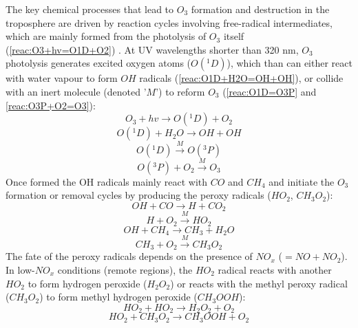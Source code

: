 \documentclass[11pt,a4paper]{article}
\begin{document}
The key chemical processes that lead to $O_3$ formation and destruction in the troposphere are driven by reaction cycles involving free-radical intermediates, which are mainly formed from the photolysis of $O_3$ itself (\ref{reac:O3+hv=O1D+O2}) \citep{Fowler2008}. At UV wavelengths shorter than 320 nm, $O_3$ photolysis generates excited oxygen atoms ($O(^1D)$), which than can either react with water vapour to form $OH$ radicals (\ref{reac:O1D+H2O=OH+OH}), or collide with an inert molecule (denoted '$M$') to reform $O_3$ (\ref{reac:O1D=O3P} and \ref{reac:O3P+O2=O3}):
\begin{equation}\label{reac:O3+hv=O1D+O2}
O_3 + hv \rightarrow O(^1D) + O_2
\end{equation}
\begin{equation}\label{reac:O1D+H2O=OH+OH}
O(^1D) + H_2O \rightarrow OH + OH
\end{equation}
\begin{equation}\label{reac:O1D=O3P}
O(^1D) \xrightarrow{M} O(^3P)
\end{equation}
\begin{equation}\label{reac:O3P+O2=O3}
O(^3P) + O_2 \xrightarrow{M} O_3
\end{equation}
Once formed the OH radicals mainly react with $CO$ and $CH_4$ and initiate the $O_3$ formation or removal cycles by producing the peroxy radicals ($HO_2$, $CH_3O_2$):
\begin{equation}\label{reac:OH+CO=H+CO2}
OH + CO \rightarrow H + CO_2
\end{equation}
\begin{equation}\label{reac:H+O2=HO2}
H + O_2 \xrightarrow{M} HO_2
\end{equation}
\begin{equation}\label{reac:OH+CH4=CH3+H2O}
OH + CH_4 \rightarrow CH_3 + H_2O
\end{equation}
\begin{equation}\label{reac:CH3O+O2=CH3O2}
CH_3 + O_2 \xrightarrow{M} CH_3O_2
\end{equation}
The fate of the peroxy radicals depends on the presence of $NO_x$ ($=NO + NO_2$). In low-$NO_x$ conditions (remote regions), the $HO_2$ radical reacts with another $HO_2$ to form hydrogen peroxide ($H_2O_2$) or reacts with the methyl peroxy radical ($CH_3O_2$) to form methyl hydrogen peroxide ($CH_3OOH$):
\begin{equation} \label{reac:HO2+HO2=H2O2+O2}
HO_2 + HO_2 \rightarrow H_2O_2 + O_2
\end{equation}
\begin{equation} \label{reac:HO2+CH3O2=CH3OOH+O2}
HO_2 + CH_3O_2 \rightarrow CH_3OOH + O_2
\end{equation}
\end{document}
